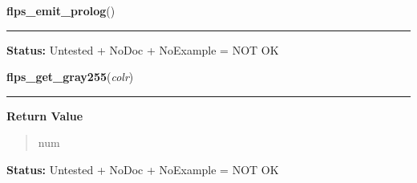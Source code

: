     \label{xformslib:library:flps_emit_prolog}

    \vspace{0.5ex}

\hspace{.8\funcindent}\begin{boxedminipage}{\funcwidth}

    \raggedright \textbf{flps\_emit\_prolog}()

    \vspace{-1.5ex}

    \rule{\textwidth}{0.5\fboxrule}
\setlength{\parskip}{2ex}
\setlength{\parskip}{1ex}
\textbf{Status:} Untested + NoDoc + NoExample = NOT OK



    \end{boxedminipage}

    \label{xformslib:library:flps_get_gray255}

    \vspace{0.5ex}

\hspace{.8\funcindent}\begin{boxedminipage}{\funcwidth}

    \raggedright \textbf{flps\_get\_gray255}(\textit{colr})

    \vspace{-1.5ex}

    \rule{\textwidth}{0.5\fboxrule}
\setlength{\parskip}{2ex}
\setlength{\parskip}{1ex}
      \textbf{Return Value}
    \vspace{-1ex}

      \begin{quote}
      num

      \end{quote}

\textbf{Status:} Untested + NoDoc + NoExample = NOT OK



    \end{boxedminipage}

    \label{xformslib:library:flps_get_linestyle}

